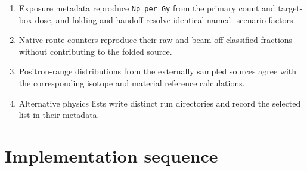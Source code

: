 \documentclass[11pt]{article}
\newcommand{\file}[1]{\texttt{#1}}
\begin{document}
\begin{enumerate}
        and positron-range reference distributions while its extended event
        table preserves the channel, target, proton energy, proposal weight
        and variant provenance.
  \item Exposure metadata reproduce \file{Np\_per\_Gy} from the primary count
        and target-box dose, and folding and handoff resolve identical named-
        scenario factors.
  \item Native-route counters reproduce their raw and beam-off classified
        fractions without contributing to the folded source.
  \item Positron-range distributions from the externally sampled sources agree
        with the corresponding isotope and material reference calculations.
  \item Alternative physics lists write distinct run directories and record
        the selected list in their metadata.
\end{enumerate}

\section{Implementation sequence}
\end{document}
